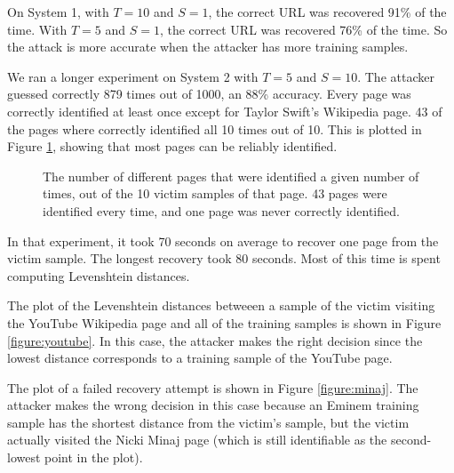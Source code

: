 \documentclass[letterpaper,twocolumn,10pt]{article}
\begin{document}
On System 1, with $T=10$ and $S=1$, the correct URL was recovered 91\% of the
time. With $T=5$ and $S=1$, the correct URL was
recovered 76\% of the time. So the attack is more
accurate when the attacker has more training samples.

We ran a longer experiment on System 2 with $T=5$ and
$S=10$. The attacker guessed correctly 879 times out of 1000, an 88\% accuracy.
Every page was correctly identified at least once except for Taylor Swift's
Wikipedia page. 43 of the pages where correctly identified all 10 times out of
10. This is plotted in Figure \ref{figure:identifycounts}, showing that most
pages can be reliably identified.

\begin{figure}
    \centering
    
    \caption{The number of different
    pages that were identified a given number of times, out of the 10 victim
samples of that page. 43 pages were identified every time, and one page was
never correctly identified.}
    \label{figure:identifycounts}
\end{figure}

In that experiment, it took 70 seconds on average to recover one page from the
victim sample. The longest recovery took 80 seconds. Most of this time is spent
computing Levenshtein distances.

The plot of the Levenshtein distances betweeen a sample of the victim visiting
the YouTube Wikipedia page and all of the training samples is shown in Figure
\ref{figure:youtube}. In this case, the attacker makes the right decision since
the lowest distance corresponds to a training sample of the YouTube page.

The plot of a failed recovery attempt is shown in Figure \ref{figure:minaj}. The
attacker makes the wrong decision in this case because an Eminem training sample
has the shortest distance from the victim's sample, but the victim actually
visited the Nicki Minaj page (which is still identifiable as the second-lowest
point in the plot).

\begin{figure*}
    \centering
    
    \caption{A successful recovery. The Levenshtein distance between the
    training samples and a recording of the victim visiting the YouTube
    Wikipedia page. The shortest distance is visible at mark 68 on the page axis
    which corresponds to a YouTube training sample. The outlier at mark 29
    corresponds to a disambiguation page that has a different format from the
usual Wikipedia page. The different shapes in a column represent the five
training samples of that page. The order on the page axis is not meaningful.}
    \label{figure:youtube}
\end{figure*}
\end{document}
